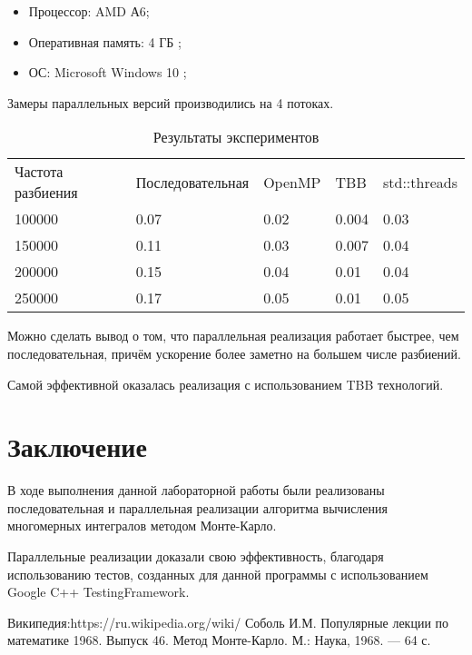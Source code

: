 \documentclass{report}
\begin{document}
\begin{itemize}
\item Процессор: AMD А6;
\item Оперативная память: 4 ГБ ;
\item ОС: Microsoft Windows 10 ;
\end{itemize}
\par Замеры параллельных версий производились на 4 потоках.
\begin{table}[!h]
\caption{Результаты экспериментов}
\centering
\begin{tabular}{lllll}
Частота разбиения & Последовательная & OpenMP & TBB & std::threads     \\
100000    & 0.07                    & 0.02       & 0.004    & 0.03     \\
150000    & 0.11                    & 0.03       & 0.007    & 0.04     \\
200000   & 0.15                    & 0.04       & 0.01      & 0.04     \\
250000   & 0.17                   & 0.05       & 0.01       & 0.05     \\
\end{tabular}
\end{table}

\par Можно сделать вывод о том, что параллельная реализация работает быстрее, чем последовательная, причём ускорение более заметно на большем числе разбиений.
\par Самой эффективной оказалась реализация с использованием TBB технологий.
\newpage

\section*{Заключение}
В ходе выполнения данной лабораторной работы были реализованы последовательная и параллельная реализации алгоритма вычисления многомерных интегралов методом Монте-Карло.
\par Параллельные реализации доказали свою эффективность, благодаря использованию тестов, созданных для данной программы с использованием Google C++ TestingFramework.
\newpage
\begin{thebibliography}{1}
 Википедия:https://ru.wikipedia.org/wiki/%
 Соболь И.М. Популярные лекции по математике 1968. Выпуск 46.
Метод Монте-Карло. М.: Наука, 1968. — 64 с.
\end{thebibliography}
\newpage
\end{document}

